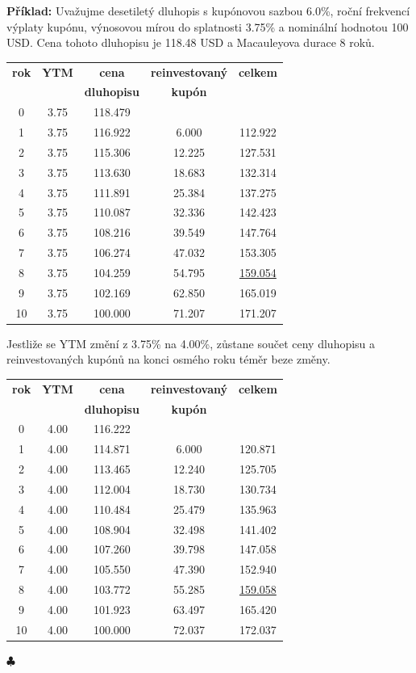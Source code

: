 \documentclass[a4paper]{book}
\begin{document}
\noindent \textbf{Příklad:} Uvažujme desetiletý dluhopis s kupónovou sazbou 6.0\%, roční frekvencí výplaty kupónu, výnosovou mírou do splatnosti 3.75\% a nominální hodnotou 100 USD. Cena tohoto dluhopisu je 118.48 USD a Macauleyova durace 8 roků.
\begin{center}
\begin{tabular}{c c c c c}
\textbf{rok} & \textbf{YTM} & \textbf{cena}      & \textbf{reinvestovaný} & \textbf{celkem} \\
             &              & \textbf{dluhopisu} & \textbf{kupón}         &  \\
\hline
0  & 3.75 & 118.479 &        &         \\
1  & 3.75 & 116.922 &  6.000 & 112.922 \\
2  & 3.75 & 115.306 & 12.225 & 127.531 \\
3  & 3.75 & 113.630 & 18.683 & 132.314 \\
4  & 3.75 & 111.891 & 25.384 & 137.275 \\
5  & 3.75 & 110.087 & 32.336 & 142.423 \\
6  & 3.75 & 108.216 & 39.549 & 147.764 \\
7  & 3.75 & 106.274 & 47.032 & 153.305 \\
8  & 3.75 & 104.259 & 54.795 & \underline{159.054}\\
9  & 3.75 & 102.169 & 62.850 & 165.019 \\
10 & 3.75 & 100.000 & 71.207 & 171.207
\end{tabular}
\end{center}
Jestliže se YTM změní z 3.75\% na 4.00\%, zůstane součet ceny dluhopisu a reinvestovaných kupónů na konci osmého roku téměr beze změny.
\begin{center}
\begin{tabular}{c c c c c}
\textbf{rok} & \textbf{YTM} & \textbf{cena}      & \textbf{reinvestovaný} & \textbf{celkem} \\
             &              & \textbf{dluhopisu} & \textbf{kupón}         &  \\
\hline
0  & 4.00 & 116.222 &       &          \\
1  & 4.00 & 114.871 &  6.000 & 120.871 \\
2  & 4.00 & 113.465 & 12.240 & 125.705 \\
3  & 4.00 & 112.004 & 18.730 & 130.734 \\
4  & 4.00 & 110.484 & 25.479 & 135.963 \\
5  & 4.00 & 108.904 & 32.498 & 141.402 \\
6  & 4.00 & 107.260 & 39.798 & 147.058 \\
7  & 4.00 & 105.550 & 47.390 & 152.940 \\
8  & 4.00 & 103.772 & 55.285 & \underline{159.058} \\
9  & 4.00 & 101.923 & 63.497 & 165.420 \\
10 & 4.00 & 100.000 & 72.037 & 172.037
\end{tabular}
\end{center}
$\clubsuit$\\
\end{document}

